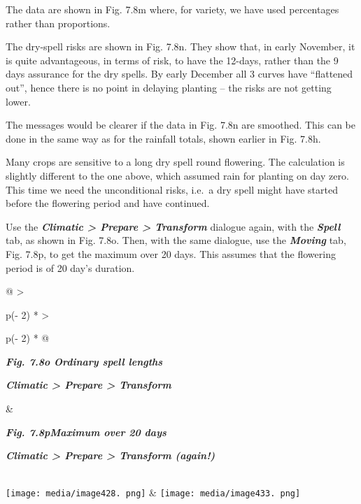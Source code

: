 \documentclass[
  letterpaper,
  DIV=11,
  numbers=noendperiod]{scrreprt}
\begin{document}
The data are shown in Fig. 7.8m where, for variety, we have used
percentages rather than proportions.

The dry-spell risks are shown in Fig. 7.8n. They show that, in early
November, it is quite advantageous, in terms of risk, to have the
12-days, rather than the 9 days assurance for the dry spells. By early
December all 3 curves have ``flattened out'', hence there is no point in
delaying planting -- the risks are not getting lower.

The messages would be clearer if the data in Fig. 7.8n are smoothed.
This can be done in the same way as for the rainfall totals, shown
earlier in Fig. 7.8h.

Many crops are sensitive to a long dry spell round flowering. The
calculation is slightly different to the one above, which assumed rain
for planting on day zero. This time we need the unconditional risks,
i.e.~a dry spell might have started before the flowering period and have
continued.

Use the \textbf{\emph{Climatic \textgreater{} Prepare \textgreater{}
Transform}} dialogue again, with the \textbf{\emph{Spell}} tab, as shown
in Fig. 7.8o. Then, with the same dialogue, use the
\textbf{\emph{Moving}} tab, Fig. 7.8p, to get the maximum over 20 days.
This assumes that the flowering period is of 20 day's duration.

\begin{longtable}[]{@{}
  >{\raggedright\arraybackslash}p{(\columnwidth - 2\tabcolsep) * }
  >{\raggedright\arraybackslash}p{(\columnwidth - 2\tabcolsep) * }@{}}
\toprule\noalign{}
\begin{minipage}[b]{\linewidth}\raggedright
\textbf{\emph{Fig. 7.8o Ordinary spell lengths}}

\textbf{\emph{Climatic \textgreater{} Prepare \textgreater{} Transform}}
\end{minipage} & \begin{minipage}[b]{\linewidth}\raggedright
\textbf{\emph{Fig. 7.8pMaximum over 20 days}}

\textbf{\emph{Climatic \textgreater{} Prepare \textgreater{} Transform
(again!)}}
\end{minipage} \\
\midrule\noalign{}
\endhead
\bottomrule\noalign{}
\endlastfoot
\texttt{[image: media/image428. png]}
&
\texttt{[image: media/image433. png]} \\
\end{longtable}
\end{document}
